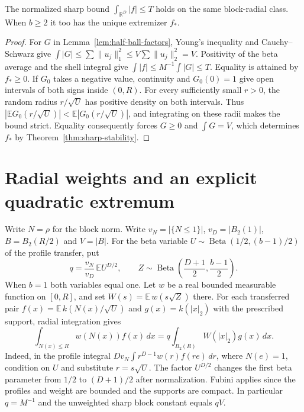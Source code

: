 \documentclass[11pt,a4paper]{article}
\numberwithin{equation}{section}
\begin{document}
\begin{corollary}
The normalized sharp bound $\int_{\mathbb R^D}|f|\le T$ holds on the same block-radial class. When $b\ge2$ it too has the unique extremizer $f_*$.
\end{corollary}
\begin{proof}
For $G$ in Lemma~\ref{lem:half-ball-factors}, Young's inequality and Cauchy--Schwarz give $\int |G|\le\sum\|u_j\|_1^2\le V\sum\|u_j\|_2^2=V$. Positivity of the beta average and the shell integral give $\int|f|\le M^{-1}\int|G|\le T$. Equality is attained by $f_*\ge0$. If $G_0$ takes a negative value, continuity and $G_0(0)=1$ give open intervals of both signs inside $(0,R)$. For every sufficiently small $r>0$, the random radius $r/\sqrt U$ has positive density on both intervals. Thus $|\mathbb E G_0(r/\sqrt U)|<\mathbb E|G_0(r/\sqrt U)|$, and integrating on these radii makes the bound strict. Equality consequently forces $G\ge0$ and $\int G=V$, which determines $f_*$ by Theorem~\ref{thm:sharp-stability}.
\end{proof}


\section{Radial weights and an explicit quadratic extremum}
\label{sec:weighted-block}
Write $N=\rho$ for the block norm. Write $v_N=|\{N\le1\}|$, $v_D=|B_2(1)|$, $B=B_2(R/2)$ and $V=|B|$. For the beta variable $U\sim\operatorname{Beta}(1/2,(b-1)/2)$ of the profile transfer, put
\[
 q=\frac{v_N}{v_D}\,\mathbb E U^{D/2},\qquad
 Z\sim\operatorname{Beta}\!\left(\frac{D+1}{2},\frac{b-1}{2}\right).
\]
When $b=1$ both variables equal one. Let $w$ be a real bounded measurable function on $[0,R]$, and set $W(s)=\mathbb E\,w(s\sqrt Z)$ there. For each transferred pair $f(x)=\mathbb E\,k(N(x)/\sqrt U)$ and $g(x)=k(|x|_2)$ with the prescribed support, radial integration gives
\begin{equation}
  \int_{N(x)\le R} w(N(x))f(x)\,dx
  =q\int_{B_2(R)} W(|x|_2)g(x)\,dx .
  \label{eq:weight-pullback}
\end{equation}
Indeed, in the profile integral $Dv_N\int r^{D-1}w(r)f(re)\,dr$, where $N(e)=1$, condition on $U$ and substitute $r=s\sqrt U$. The factor $U^{D/2}$ changes the first beta parameter from $1/2$ to $(D+1)/2$ after normalization. Fubini applies since the profiles and weight are bounded and the supports are compact. In particular $q=M^{-1}$ and the unweighted sharp block constant equals $qV$.
\end{document}
